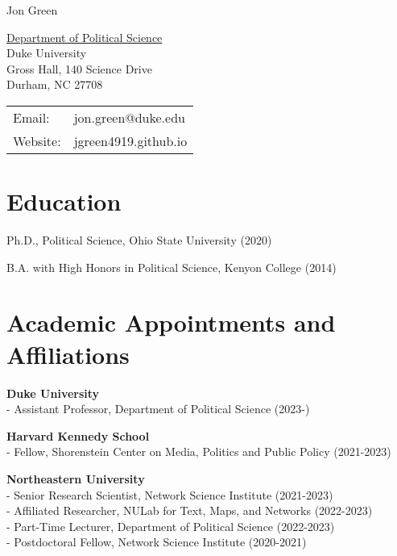 \documentclass[letterpaper]{article}
\def\name{Jon Green}
\renewenvironment{itemize}{
  \begin{list}{}{
    \setlength{\leftmargin}{1.5em}
  }
}{
  \end{list}
}
\begin{document}
{\huge \name}


\vspace{0.25in}

\begin{minipage}{0.45\linewidth}
  \href{https://polisci.duke.edu//}{Department of Political Science} \\
    Duke University \\
    Gross Hall, 140 Science Drive\\
  Durham, NC 27708
\end{minipage}
\begin{minipage}{0.45\linewidth}
  \begin{tabular}{ll}
    Email: & jon.green@duke.edu \\
    Website: & jgreen4919.github.io \\
  \end{tabular}
\end{minipage}

\section*{Education}

\begin{itemize}
    \item Ph.D., Political Science, Ohio State University (2020)
	\item B.A. with High Honors in Political Science, Kenyon College (2014)
\end{itemize}

\section*{Academic Appointments and Affiliations}
\begin{itemize}

\item \textbf{Duke University} \\
- Assistant Professor, Department of Political Science (2023-)

\item \textbf{Harvard Kennedy School} \\
- Fellow, Shorenstein Center on Media, Politics and Public Policy (2021-2023)

\item \textbf{Northeastern University} \\
- Senior Research Scientist, Network Science Institute (2021-2023)\\
- Affiliated Researcher, NULab for Text, Maps, and Networks (2022-2023) \\
- Part-Time Lecturer, Department of Political Science (2022-2023)\\
- Postdoctoral Fellow, Network Science Institute  (2020-2021)


\end{itemize}
\end{document}
